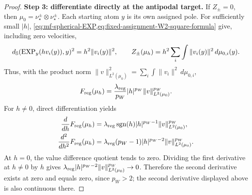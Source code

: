 \begin{proof}
\par\noindent\textbf{Step 3: differentiate directly at the antipodal target.}
If $Z_\pm=0$, then $\mu_0=\nu_\star^\pm\otimes\nu_\star^\pm$.
Each starting atom $y$ is its own assigned pole. For sufficiently small
$|h|$, \cref{eq:mf-spherical-EXP,eq:fixed-assignment-W2-square-formula}
give, including zero velocities,
\[
 d_{\mathbb{S}}(\mathrm{EXP}_y(hv_i(y)),y)^2=h^2\|v_i(y)\|^2,
 \qquad
 Z_\pm(\mu_h)=h^2\sum_i\int\|v_i(y)\|^2\,d\mu_{0,i}(y).
\]
Thus, with the product norm
$\|v\|_{L^2(\mu_0)}^2=\sum_i\int\|v_i\|^2\,d\mu_{0,i}$,
\begin{equation}
\label{eq:mf-center-EXP-regularizer}
 F_{\mathrm{reg}}(\mu_h)
 =\frac{\lambda_{\mathrm{reg}}}{p_W}|h|^{p_W}\|v\|_{L^2(\mu_0)}^{p_W}.
\end{equation}
For $h\ne0$, direct differentiation yields
\[
\begin{aligned}
 \frac d{dh}F_{\mathrm{reg}}(\mu_h)
 &=\lambda_{\mathrm{reg}}\operatorname{sgn}(h)|h|^{p_W-1}\|v\|_{L^2(\mu_0)}^{p_W},\\
 \frac{d^2}{dh^2}F_{\mathrm{reg}}(\mu_h)
 &=\lambda_{\mathrm{reg}}(p_W-1)|h|^{p_W-2}\|v\|_{L^2(\mu_0)}^{p_W}.
\end{aligned}
\]
At $h=0$, the value difference quotient tends to zero. Dividing the
first derivative at $h\ne0$ by $h$ gives
$\lambda_{\mathrm{reg}}|h|^{p_W-2}\|v\|_{L^2(\mu_0)}^{p_W}\to0$.
Therefore the second derivative exists at zero and equals zero, since
$p_W>2$; the second derivative displayed above is also continuous there.
\end{proof}

